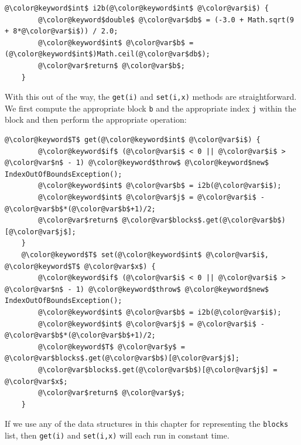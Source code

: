 \begin{Verbatim}[tabsize=2,frame=single,commandchars=\\@\$,label=\texttt{RootishArrayStack},labelposition=topline]
	 @\color@keyword$int$ i2b(@\color@keyword$int$ @\color@var$i$) {
		@\color@keyword$double$ @\color@var$db$ = (-3.0 + Math.sqrt(9 + 8*@\color@var$i$)) / 2.0;
		@\color@keyword$int$ @\color@var$b$ = (@\color@keyword$int$)Math.ceil(@\color@var$db$);
		@\color@var$return$ @\color@var$b$; 
	}
\end{Verbatim}

With this out of the way, the \mbox{\texttt{get({\color{var}i})}} and \mbox{\texttt{set({\color{var}i},{\color{var}x})}} methods are straightforward.  We first compute the appropriate block \mbox{\texttt{{\color{var}b}}} and the appropriate index \mbox{\texttt{{\color{var}j}}} within the block and then perform the appropriate operation:

\begin{Verbatim}[tabsize=2,frame=single,commandchars=\\@\$,label=\texttt{RootishArrayStack},labelposition=topline]
	@\color@keyword$T$ get(@\color@keyword$int$ @\color@var$i$) {
		@\color@keyword$if$ (@\color@var$i$ < 0 || @\color@var$i$ > @\color@var$n$ - 1) @\color@keyword$throw$ @\color@keyword$new$ IndexOutOfBoundsException();
		@\color@keyword$int$ @\color@var$b$ = i2b(@\color@var$i$);
		@\color@keyword$int$ @\color@var$j$ = @\color@var$i$ - @\color@var$b$*(@\color@var$b$+1)/2;
		@\color@var$return$ @\color@var$blocks$.get(@\color@var$b$)[@\color@var$j$];
	}
	@\color@keyword$T$ set(@\color@keyword$int$ @\color@var$i$, @\color@keyword$T$ @\color@var$x$) {
		@\color@keyword$if$ (@\color@var$i$ < 0 || @\color@var$i$ > @\color@var$n$ - 1) @\color@keyword$throw$ @\color@keyword$new$ IndexOutOfBoundsException();
		@\color@keyword$int$ @\color@var$b$ = i2b(@\color@var$i$);
		@\color@keyword$int$ @\color@var$j$ = @\color@var$i$ - @\color@var$b$*(@\color@var$b$+1)/2;
		@\color@keyword$T$ @\color@var$y$ = @\color@var$blocks$.get(@\color@var$b$)[@\color@var$j$];
		@\color@var$blocks$.get(@\color@var$b$)[@\color@var$j$] = @\color@var$x$;
		@\color@var$return$ @\color@var$y$;
	}
\end{Verbatim}

If we use any of the data structures in this chapter for representing the \mbox{\texttt{{\color{var}blocks}}} list, then \mbox{\texttt{get({\color{var}i})}} and \mbox{\texttt{set({\color{var}i},{\color{var}x})}} will each run in constant time.

